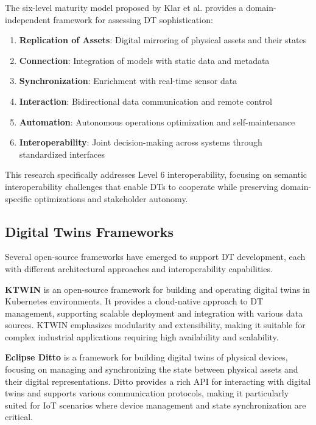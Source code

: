 The six-level maturity model proposed by Klar et al. \cite{Klar_2024} provides a domain-independent framework for assessing DT sophistication:
\begin{enumerate}
    \item \textbf{Replication of Assets}: Digital mirroring of physical assets and their states
    \item \textbf{Connection}: Integration of models with static data and metadata
    \item \textbf{Synchronization}: Enrichment with real-time sensor data
    \item \textbf{Interaction}: Bidirectional data communication and remote control
    \item \textbf{Automation}: Autonomous operations optimization and self-maintenance
    \item \textbf{Interoperability}: Joint decision-making across systems through standardized interfaces
\end{enumerate}

This research specifically addresses Level 6 interoperability,
    focusing on semantic interoperability challenges that enable DTs to cooperate while 
    preserving domain-specific optimizations and stakeholder autonomy.

\subsection{Digital Twins Frameworks}

Several open-source frameworks have emerged to support DT development, each with different architectural approaches and interoperability capabilities.

\textbf{KTWIN} is an open-source framework for building and operating digital twins in Kubernetes environments.
It provides a cloud-native approach to DT management, supporting scalable deployment and integration with various data sources.
KTWIN emphasizes modularity and extensibility, making it suitable for complex industrial applications requiring high availability and scalability.

\textbf{Eclipse Ditto} is a framework for building digital twins of physical devices,
    focusing on managing and synchronizing the state between physical assets and their digital representations.
Ditto provides a rich API for interacting with digital twins and supports various communication protocols,
    making it particularly suited for IoT scenarios where device management and state synchronization are critical.


